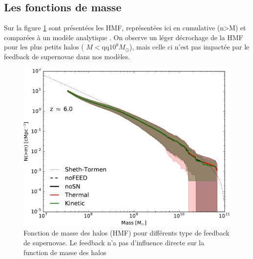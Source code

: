 \subsection{Les fonctions de masse}
\label{sec:hmf}

Sur la figure \ref{fig:ghmf} sont présentées les \ac{HMF}, représentées ici en cumulative (n>M) et comparées à un modèle analytique \citep{1999MNRAS.308..119S}.
On observe un léger décrochage de la \ac{HMF} pour les plus petits halos ( $M< \mathrm{qq} 10^8 M_\odot$), mais celle ci n'est pas impactée par le feedback de supernovae dans nos modèles.

\begin{figure}
		\includegraphics[width=.95\linewidth]{img/03/ghmf.pdf}
        \caption[Fonctions de masses des halos]{Fonction de masse des halos (\ac{HMF}) pour différents type de feedback de supernovae.
        Le feedback n'a pas d'influence directe sur la function de masse des halos
 		\label{fig:ghmf}}
\end{figure}



